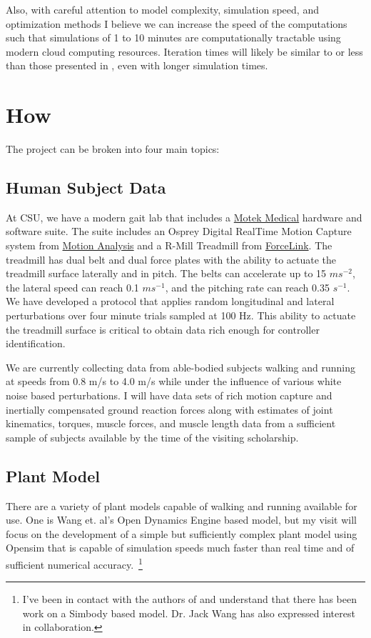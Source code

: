 \documentclass[11pt]{article}
\begin{document}
Also, with careful attention to model complexity, simulation speed, and
optimization methods I believe we can increase the speed of the computations
such that simulations of 1 to 10 minutes are computationally tractable using
modern cloud computing resources. Iteration times will likely be similar to or
less than those presented in \cite{Wang2012}, even with longer simulation
times.

\section*{How}

The project can be broken into four main topics:

\subsection*{Human Subject Data}

At CSU, we have a modern gait lab that includes a
\href{http://www.motekmedical.com}{Motek Medical} hardware and software suite.
The suite includes an Osprey Digital RealTime Motion Capture system from
\href{http://www.motionanalysis.com}{Motion Analysis} and a R-Mill Treadmill
from \href{http://www.forcelink.nl}{ForceLink}. The treadmill has dual belt and
dual force plates with the ability to actuate the treadmill surface laterally
and in pitch. The belts can accelerate up to 15 $ms^{-2}$, the lateral speed
can reach 0.1 $ms^{-1}$, and the pitching rate can reach 0.35 $s^{-1}$. We have
developed a protocol that applies random longitudinal and lateral perturbations
over four minute trials sampled at 100 Hz. This ability to actuate the
treadmill surface is critical to obtain data rich enough for controller
identification.


We are currently collecting data from able-bodied subjects walking and running
at speeds from 0.8 m/s to 4.0 m/s while under the influence of various white
noise based perturbations. I will have data sets of rich motion capture and
inertially compensated ground reaction forces along with estimates of joint
kinematics, torques, muscle forces, and muscle length data from a sufficient
sample of subjects available by the time of the visiting scholarship.

\subsection*{Plant Model}
There are a variety of plant models capable of walking and running available
for use. One is Wang et. al's Open Dynamics Engine based model, but my visit
will focus on the development of a simple but sufficiently complex plant model
using Opensim that is capable of simulation speeds much faster than real time
and of sufficient numerical accuracy.~\footnote{I've been in contact with the
  authors of \cite{Wang2012} and understand that there has been work on a
  Simbody based model. Dr. Jack Wang has also expressed interest in
collaboration.}
\end{document}

